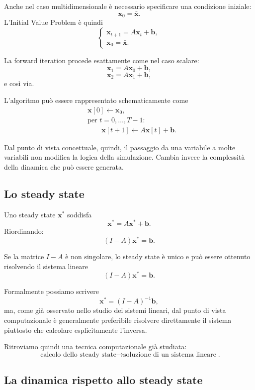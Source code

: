 \documentclass{book}
\begin{document}
Anche nel caso multidimensionale è necessario specificare una condizione
iniziale:
\[
\mathbf{x}_0=\bar{\mathbf{x}}.
\]
L'Initial Value Problem è quindi
\[
\begin{cases}
\mathbf{x}_{t+1}=A\mathbf{x}_t+\mathbf{b},\\
\mathbf{x}_0=\bar{\mathbf{x}}.
\end{cases}
\]

La forward iteration procede esattamente come nel caso scalare:
\[
\mathbf{x}_1=A\mathbf{x}_0+\mathbf{b},
\]
\[
\mathbf{x}_2=A\mathbf{x}_1+\mathbf{b},
\]
e così via.

L'algoritmo può essere rappresentato schematicamente come
\[
\begin{aligned}
&\mathbf{x}[0]\leftarrow\mathbf{x}_0,\\
&\text{per }t=0,\ldots,T-1:\\
&\qquad
\mathbf{x}[t+1]\leftarrow
A\mathbf{x}[t]+\mathbf{b}.
\end{aligned}
\]

Dal punto di vista concettuale, quindi, il passaggio da una variabile a
molte variabili non modifica la logica della simulazione. Cambia invece
la complessità della dinamica che può essere generata.


\subsection{Lo steady state}

Uno steady state $\mathbf{x}^*$ soddisfa
\[
\mathbf{x}^*
=
A\mathbf{x}^*+\mathbf{b}.
\]
Riordinando:
\[
(I-A)\mathbf{x}^*
=
\mathbf{b}.
\]

Se la matrice $I-A$ è non singolare, lo steady state è unico e può essere
ottenuto risolvendo il sistema lineare
\[
(I-A)\mathbf{x}^*=\mathbf{b}.
\]

Formalmente possiamo scrivere
\[
\mathbf{x}^*
=
(I-A)^{-1}\mathbf{b},
\]
ma, come già osservato nello studio dei sistemi lineari, dal punto di vista
computazionale è generalmente preferibile risolvere direttamente il sistema
piuttosto che calcolare esplicitamente l'inversa.

Ritroviamo quindi una tecnica computazionale già studiata:
\[
\boxed{
\text{calcolo dello steady state}
\longrightarrow
\text{soluzione di un sistema lineare}
}.
\]


\subsection{La dinamica rispetto allo steady state}
\end{document}
